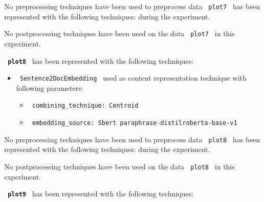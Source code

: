 \documentclass[11pt]{article}
\begin{document}
No preprocessing techniques have been used to preprocess data \lstinline[style=verbatim-text]| plot7 | has been represented with the following techniques:
 during the experiment.
\hfill\break
\hfill\break



No postprocessing techniques have been used on the data \lstinline[style=verbatim-text]| plot7 | in this experiment.
\hfill\break
\hfill\break



\textbf{\lstinline[style=verbatim-text]| plot8 |} has been represented with the following techniques:
\hfill\break
\hfill\break

\begin{itemize}
                                                            
            \item
        \verb| Sentence2DocEmbedding | used as content representation technique with following parameters:
        \begin{itemize}
                            \item
                \verb| combining_technique: Centroid|
                            \item
                \verb| embedding_source: Sbert paraphrase-distilroberta-base-v1|
                    \end{itemize}
    \end{itemize}
\hfill\break
\hfill\break



No preprocessing techniques have been used to preprocess data \lstinline[style=verbatim-text]| plot8 | has been represented with the following techniques:
 during the experiment.
\hfill\break
\hfill\break



No postprocessing techniques have been used on the data \lstinline[style=verbatim-text]| plot8 | in this experiment.
\hfill\break
\hfill\break



\textbf{\lstinline[style=verbatim-text]| plot9 |} has been represented with the following techniques:
\hfill\break
\hfill\break
\end{document}

